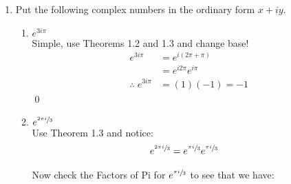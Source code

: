 \begin{enumerate}
\begin{enumerate}
		      \item $5i$

		            Go up by $5i$ in the complex plane:
		            \[ 5i = 5e^{\sfrac{i\pi}{2}} \]
		            \qed

		      \item $-7$

		            Go left by $-7$ in the complex plane:
		            \[-7 = 7e^{i\pi} \]
		            \qed

		      \item $-1 - i$

		            Go left by $-1$ and down by $-1$ in the complex plane:
		            \begin{align*}
			            r = |z| & = \sqrt{1^2 + 1^2} \\
			                    & = \sqrt{1 + 1}     \\
			            \therefore \; r
			                    & = \sqrt{2}         \\
		            \end{align*}
		            So then:
		            \[ -1 - i = \sqrt{2}e^{\sfrac{5i\pi}{4}} \]
		            \qed
	      \end{enumerate}

	\item Put the following complex numbers in the ordinary form $x + iy.$
	      \begin{enumerate}

		      \item $e^{3i\pi}$ \\
		            Simple, use Theorems 1.2 and 1.3 and change base!
		            \begin{align*}
			            e^{3i\pi} & = e^{i(2\pi + \pi)} \\
			                      & = e^{i2\pi}e^{i\pi} \\
			            \therefore \; e^{3i\pi}
			                      & = (1)(-1) = -1
		            \end{align*}
		            \qed

		      \item $e^{\sfrac{2\pi i}{3}}$ \\
		            Use Theorem 1.3 and notice:
		            \begin{align*}
			            e^{\sfrac{2\pi i}{3}} & = e^{\sfrac{\pi i}{3}}e^{\sfrac{\pi i}{3}}
		            \end{align*}

		            Now check the Factors of Pi for $e^{\sfrac{\pi i}{3}}$ to see that we have:


\end{enumerate}
\end{enumerate}
